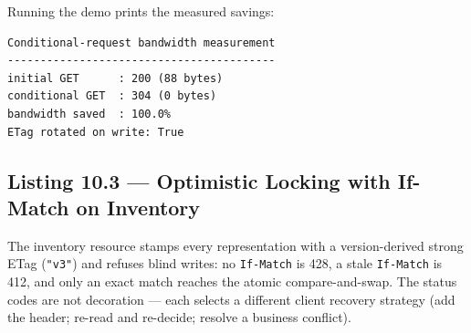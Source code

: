 Running the demo prints the measured savings:

\begin{verbatim}
Conditional-request bandwidth measurement
-----------------------------------------
initial GET      : 200 (88 bytes)
conditional GET  : 304 (0 bytes)
bandwidth saved  : 100.0%
ETag rotated on write: True
\end{verbatim}

\subsection{Listing 10.3 --- Optimistic Locking with If-Match on Inventory}
\label{sec:ch10-listing3}

The inventory resource stamps every representation with a version-derived
strong ETag (\texttt{"v3"}) and refuses blind writes: no \texttt{If-Match}
is 428, a stale \texttt{If-Match} is 412, and only an exact match reaches
the atomic compare-and-swap. The status codes are not decoration --- each
selects a different client recovery strategy (add the header; re-read and
re-decide; resolve a business conflict).

